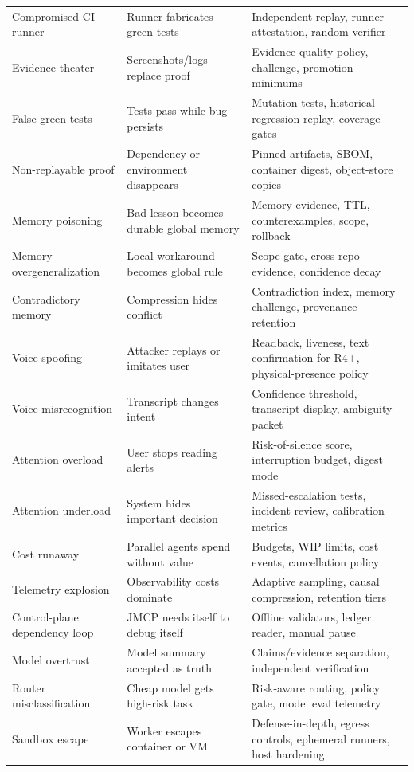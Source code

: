 \documentclass[journal,onecolumn]{IEEEtran}
\begin{document}
\begin{longtable}{p{}p{}p{}}
Compromised CI runner & Runner fabricates green tests & Independent replay, runner attestation, random verifier\\
Evidence theater & Screenshots/logs replace proof & Evidence quality policy, challenge, promotion minimums\\
False green tests & Tests pass while bug persists & Mutation tests, historical regression replay, coverage gates\\
Non-replayable proof & Dependency or environment disappears & Pinned artifacts, SBOM, container digest, object-store copies\\
Memory poisoning & Bad lesson becomes durable global memory & Memory evidence, TTL, counterexamples, scope, rollback\\
Memory overgeneralization & Local workaround becomes global rule & Scope gate, cross-repo evidence, confidence decay\\
Contradictory memory & Compression hides conflict & Contradiction index, memory challenge, provenance retention\\
Voice spoofing & Attacker replays or imitates user & Readback, liveness, text confirmation for R4+, physical-presence policy\\
Voice misrecognition & Transcript changes intent & Confidence threshold, transcript display, ambiguity packet\\
Attention overload & User stops reading alerts & Risk-of-silence score, interruption budget, digest mode\\
Attention underload & System hides important decision & Missed-escalation tests, incident review, calibration metrics\\
Cost runaway & Parallel agents spend without value & Budgets, WIP limits, cost events, cancellation policy\\
Telemetry explosion & Observability costs dominate & Adaptive sampling, causal compression, retention tiers\\
Control-plane dependency loop & JMCP needs itself to debug itself & Offline validators, ledger reader, manual pause\\
Model overtrust & Model summary accepted as truth & Claims/evidence separation, independent verification\\
Router misclassification & Cheap model gets high-risk task & Risk-aware routing, policy gate, model eval telemetry\\
Sandbox escape & Worker escapes container or VM & Defense-in-depth, egress controls, ephemeral runners, host hardening\\

\end{longtable}
\end{document}

